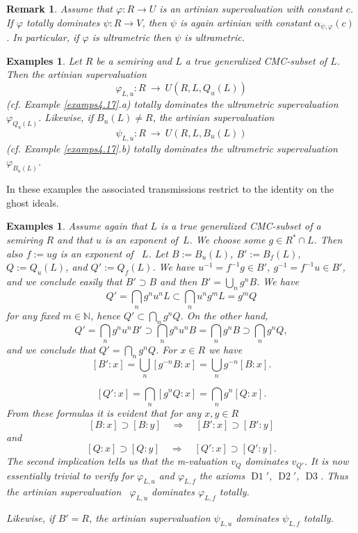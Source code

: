 \documentclass [12pt,a4paper,reqno]{amsart}
\newtheorem{examples}[thm]{Examples}
\newtheorem{remark}[thm]{Remark}
\begin{document}
\begin{remark}\label{rmk5.7}
Assume that  $ {\varphi}: R \to U$ is an artinian supervaluation with
constant $c$. If ${\varphi}$  totally dominates $\psi: R \to V$, then
$\psi$ is again artinian with constant ${\alpha}_{\psi,{\varphi}}(c)$. In
particular, if ${\varphi}$ is ultrametric then  $\psi$ is ultrametric.
\end{remark}

\begin{examples}\label{examps5.8} Let $R$ be a semiring and $L$ a
true  generalized CMC-subset of $L$. Then the artinian
supervaluation
$${\varphi}_{L,u} : R {\ {\to} \ } U(R,L, Q_u(L)) $$
(cf. Example \ref{examps4.17}.a) totally dominates the ultrametric
supervaluation ${\varphi}_{Q_u(L)}$. Likewise, if $B_n(L) \neq R$, the
artinian supervaluation
$$\psi_{L,u} : R {\ {\to} \ } U(R,L, B_u(L)) $$
(cf. Example \ref{examps4.17}.b) totally dominates the ultrametric
supervaluation ${\varphi}_{B_u(L)}$.

\end{examples}

In these examples the associated transmissions restrict to the
identity on the ghost ideals.
\begin{examples}\label{examps5.9} Assume again that $L$ is a true
generalized CMC-subset of a semiring $R$ and that $u$ is an
exponent of~$L$.  We choose some $g \in R^* \cap L$. Then also
$f:= u g$ is an exponent of~ $L$. Let $B := B_u (L)$, $B' := B_f
(L)$, $Q := Q_u (L)$, and $Q' := Q_f (L)$.  We have $u^{-1} =
f^{-1}g \in B'$, $g^{-1} = f^{-1}u \in B'$, and we conclude easily
that $B' \supset B$ and then $B' = \bigcup_ng^{n}B$. We have $$ Q'
= \bigcap_n g^n u^n L \subset \bigcap_n  u^n g^m L = g^mQ$$ for
any fixed $m \in \mathbb N$, hence $Q' \subset \bigcap_n g^n Q$.
On the other hand,
$$ Q' = \bigcap_n g^n u^n B' \supset \bigcap_n  g^n u^n  B = \bigcap_n  g^n  B \supset \bigcap_n  g^n  Q,$$
and we conclude that $ Q' = \bigcap_ng^{n}Q$. For $x\in R $ we
have
 $$[B':x]=\bigcup_n[g^{-n}B:x]=\bigcup_n g^{-n}[B:x].$$

$$[Q':x]=\bigcap_n[g^{n}Q:x]=\bigcap_n g^{n}[Q:x].$$
From these formulas it is evident that for any $x,y \in R$
$$  [B:x] \supset [B:y] {\quad {\Rightarrow} \quad } [B':x] \supset [B':y]$$
and
$$  [Q:x] \supset [Q:y] {\quad {\Rightarrow} \quad } [Q':x] \supset [Q':y].$$
The second implication tells us that the {m}-valuation $v_Q$
dominates $v_{Q'}$. It is now essentially trivial to verify for
${\varphi}_{L,u}$ and  ${\varphi}_{L,f}$ the axioms ${\operatorname{D{1}}}'$, ${\operatorname{D{2}}}'$, ${\operatorname{D{3}}}$.
Thus the artinian supervaluation~ ${\varphi}_{L,u}$  dominates
${\varphi}_{L,f}$ totally.

Likewise, if $B' = R$, the artinian supervaluation $\psi_{L,u}$
dominates $\psi_{L,f}$ totally.
\end{examples}
\end{document}
